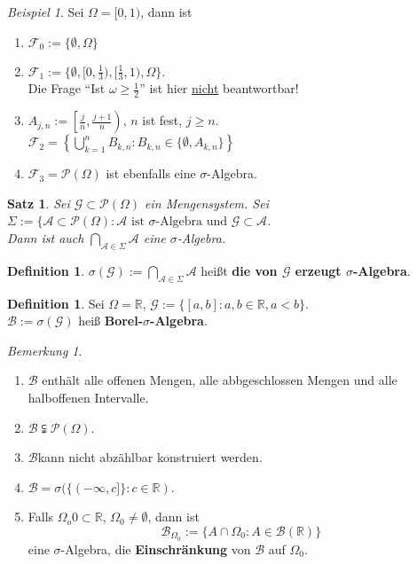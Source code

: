 \documentclass[10pt,a4paper]{article}
\newcommand{\R}{\ensuremath{\mathbb{R}}}
\newcommand{\potset}{\mathscr P}
\theoremstyle{plain}
\newtheorem{satz}[theorem]{Satz}
\theoremstyle{definition}
\newtheorem{definition}[theorem]{Definition}
\theoremstyle{remark}
\newtheorem{bem}[theorem]{Bemerkung}
\newtheorem{exm}[theorem]{Beispiel}
\begin{document}
	\begin{exm}
		Sei $\Omega=[0,1)$, dann ist \begin{enumerate}
			\item $\mathscr F_0:=\{\emptyset,\Omega\}$
			\item $\mathscr F_1:=\{\emptyset,[0,\frac{1}{3}),[\frac{1}{3},1),\Omega\}$.\\
			Die Frage ``Ist $\omega\ge \frac{1}{2}$'' ist hier \underline{nicht} beantwortbar!
			\item $A_{j,n}:=\left[\frac{j}{n},\frac{j+1}{n}\right)$, $n$ ist fest, $j\ge n$.\\
			$\mathscr F_2=\left\{\bigcup_{k=1}^{n}B_{k,n}:B_{k,n}\in\{\emptyset,A_{k,n}\}\right\}$
			\item $\mathscr F_3=\potset(\Omega)$ ist ebenfalls eine $\sigma$-Algebra.
		\end{enumerate}
	\end{exm}
	
	\begin{satz}
		Sei $\mathscr G\subset\potset(\Omega)$ ein Mengensystem. Sei $\Sigma:=\{\mathscr A\subset \potset(\Omega):\text{$\mathscr A$ ist $\sigma$-Algebra und $\mathscr G\subset\mathscr A$}$.\\
		Dann ist auch $\bigcap_{\mathscr A\in\Sigma}\mathscr A$ eine $\sigma$-Algebra.
	\end{satz}
	\addtocounter{theorem}{-1}
	\begin{definition}
		$\sigma(\mathscr G):= \bigcap_{\mathscr A\in\Sigma}\mathscr A$ heißt \textbf{die von $\mathscr G$ erzeugt $\sigma$-Algebra}.
	\end{definition}

	\begin{definition}
		Sei $\Omega=\R$, $\mathscr G:=\{[a,b]:a,b\in\R,a<b\}$.\\
		$\mathscr B:=\sigma(\mathscr G)$ heiß \textbf{Borel-$\sigma$-Algebra}.
	\end{definition}

	\begin{bem}
		\begin{enumerate}
			\item $\mathscr B$ enthält alle offenen Mengen, alle abbgeschlossen Mengen und alle halboffenen Intervalle.
			\item $\mathscr B\subsetneqq \potset (\Omega)$.
			\item $\mathscr B$kann nicht abzählbar konstruiert werden.
			\item $\mathscr B=\sigma(\{(-\infty,c]\}:c\in\R)$.
			\item Falls $\Omega_o
			0\subset\R$, $\Omega_0\neq \emptyset$, dann ist
			\[\mathscr B_{\Omega_0}:=\{ A\cap\Omega_0:A\in \mathscr B(\R)\}\]
		eine $\sigma$-Algebra, die \textbf{Einschränkung} von $\mathscr B$ auf $\Omega_0$.
		\end{enumerate}
	\end{bem}
\end{document}
